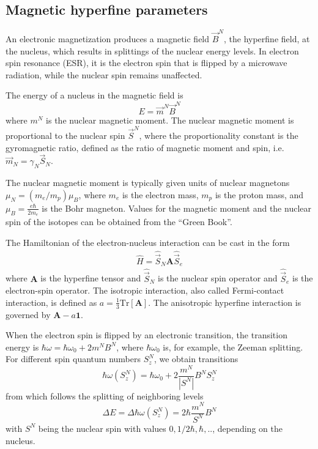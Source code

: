 \documentclass[final,12pt]{article}
\begin{document}
{{{{{{%
\subsection{Magnetic hyperfine parameters}
An electronic magnetization produces a magnetic field $\vec{B}^N$, the
hyperfine field, at the nucleus, which results in splittings of the
nuclear energy levels.  In electron spin resonance (ESR), it is the
electron spin that is flipped by a microwave radiation, while the
nuclear spin remains unaffected.

The energy of a nucleus in the magnetic field is
\begin{displaymath}
E=\vec{m}^N \vec{B}^N
\end{displaymath}
where $m^N$ is the nuclear magnetic moment. The nuclear magnetic
moment is proportional to the nuclear spin $\vec{S}^N$, where the
proportionality constant is the gyromagnetic ratio, defined as the ratio of magnetic moment and spin,
i.e. $\vec{m}_N=\gamma_N \vec{S}_N$.

The nuclear magnetic moment is typically given units of nuclear
magnetons $\mu_N=(m_e/m_p)\mu_B$, where $m_e$ is the electron mass,
$m_p$ is the proton mass, and $\mu_B=\frac{e\hbar}{2m_e}$ is the Bohr
magneton.  Values for the magnetic moment and the nuclear spin of the
isotopes can be obtained from the ``Green Book''\cite{greenbook}.

The Hamiltonian of the electron-nucleus interaction can be cast in the form
\begin{eqnarray*}
\hat{H}=\hat{\vec{S}}_N\mathbf{A}\hat{\vec{S}}_e
\end{eqnarray*}
where $\mathbf{A}$ is the hyperfine tensor and $\hat{\vec{S}}_N$ is
the nuclear spin operator and $\hat{\vec{S}}_e$ is the electron-spin
operator. The isotropic interaction, also called Fermi-contact
interaction, is defined as $a=\frac{1}{3}\textrm{Tr}[\mathbf{A}]$. The
anisotropic hyperfine interaction is governed by
$\mathbf{A}-a\mathbf{1}$.

When the electron spin is flipped by an electronic transition, the
transition energy is $\hbar\omega=\hbar\omega_0+2m^NB^N$, where
$\hbar\omega_0$ is, for example, the Zeeman splitting. For different
spin quantum numbers $S^N_z$, we obtain transitions
\begin{equation}
\hbar\omega(S^N_z)=\hbar\omega_0+2\frac{m^N}{|S^N|}B^N S^N_z
\end{equation}
from which follows the splitting of neighboring levels
\begin{equation}
\Delta E=\Delta \hbar\omega(S^N_z)=2\hbar\frac{m^N}{S^N}B^N 
\end{equation}
with $S^N$ being the nuclear spin with values $0,1/2\hbar,\hbar,..$,
depending on the nucleus.


}}}}}}
\end{document}
